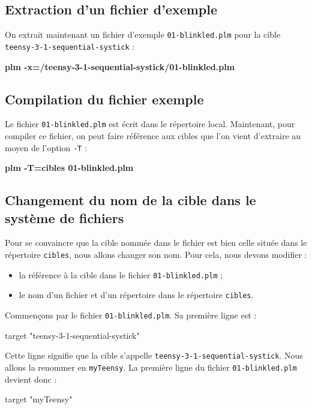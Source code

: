\subsection{Extraction d'un fichier d'exemple}
On extrait maintenant un fichier d'exemple \texttt{01-blinkled.plm} pour la cible \texttt{teensy-3-1-sequential-systick} :
\begin{SHELL}
\bfseries plm -x=/teensy-3-1-sequential-systick/01-blinkled.plm
\end{SHELL}

\subsection{Compilation du fichier exemple}
Le fichier \texttt{01-blinkled.plm} est écrit dans le répertoire local. Maintenant, pour compiler ce fichier, on peut faire référence aux cibles que l'on vient d'extraire au moyen de l'option \texttt{-T} :
\begin{SHELL}
\bfseries plm -T=cibles 01-blinkled.plm
\end{SHELL}


\subsection{Changement du nom de la cible dans le système de fichiers}

Pour se convaincre que la cible nommée dans le fichier est bien celle située dans le répertoire \texttt{cibles}, nous allons changer son nom. Pour cela, nous devons modifier :
\begin{itemize}
  \item la référence à la cible dans le fichier \texttt{01-blinkled.plm} ;
  \item le nom d'un fichier et d'un répertoire dans le répertoire \texttt{cibles}. 
\end{itemize}

Commençons par le fichier \texttt{01-blinkled.plm}. Sa première ligne est :
\begin{PLM}[1]
target "teensy-3-1-sequential-systick"
\end{PLM}

Cette ligne signifie que la cible s'appelle \texttt{teensy-3-1-sequential-systick}. Nous allons la renommer en \texttt{myTeensy}. La première ligne du fichier \texttt{01-blinkled.plm} devient donc :

\begin{PLM}[1]
target "myTeensy"
\end{PLM}

